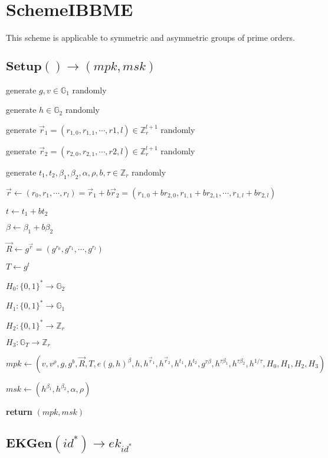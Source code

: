 \documentclass[a4paper]{article}
\begin{document}
\section{SchemeIBBME}

This scheme is applicable to symmetric and asymmetric groups of prime orders. 

\subsection{$\textbf{Setup}() \rightarrow (\textit{mpk}, \textit{msk})$}

generate $g, v \in \mathbb{G}_1$ randomly

generate $h \in \mathbb{G}_2$ randomly

generate $\vec{r}_1 = (r_{1, 0}, r_{1, 1}, \cdots, r{1, l}) \in \mathbb{Z}_r^{l + 1}$ randomly

generate $\vec{r}_2 = (r_{2, 0}, r_{2, 1}, \cdots, r{2, l}) \in \mathbb{Z}_r^{l + 1}$ randomly

generate $t_1, t_2, \beta_1, \beta_2, \alpha, \rho, b, \tau \in \mathbb{Z}_r$ randomly

$\vec{r} \gets (r_0, r_1, \cdots, r_l) = \vec{r}_1 + b\vec{r}_2 = (r_{1, 0} + br_{2, 0}, r_{1, 1} + br_{2, 1}, \cdots, r_{1, l} + br_{2, l})$

$t \gets t_1 + bt_2$

$\beta \gets \beta_1 + b\beta_2$

$\vec{R} \gets g^{\vec{r}} = (g^{r_0}, g^{r_1}, \cdots, g^{r_l})$

$T \gets g^t$

$H_0: \{0, 1\}^* \rightarrow \mathbb{G}_2$

$H_1: \{0, 1\}^* \rightarrow \mathbb{G}_1$

$H_2: \{0, 1\}^* \rightarrow \mathbb{Z}_r$

$H_3: \mathbb{G}_T \rightarrow \mathbb{Z}_r$

$\textit{mpk} \gets (v, v^\rho, g, g^b, \vec{R}, T, e(g, h)^\beta, h, h^{\vec{r}_1}, h^{\vec{r}_2}, h^{t_1}, h^{t_2}, g^{\tau\beta}, h^{\tau\beta_1}, h^{\tau\beta_2}, h^{1/\tau}, H_0, H_1, H_2, H_3)$

$\textit{msk} \gets (h^{\beta_1}, h^{\beta_2}, \alpha, \rho)$

\textbf{return} $(\textit{mpk}, \textit{msk})$

\subsection{$\textbf{EKGen}(\textit{id}^*) \rightarrow \textit{ek}_{\textit{id}^*}$}
\end{document}

